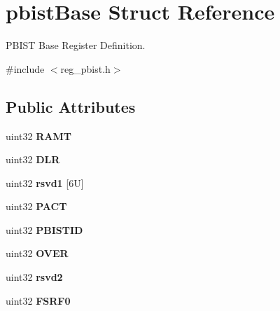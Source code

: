 \hypertarget{structpbistBase}{}\section{pbist\+Base Struct Reference}
\label{structpbistBase}


P\+B\+I\+ST Base Register Definition.  




{\ttfamily \#include $<$reg\+\_\+pbist.\+h$>$}

\subsection*{Public Attributes}
\begin{DoxyCompactItemize}
\item 
\mbox{\label{structpbistBase_a2df152f628e9d97d709a1a7144040f54}} 
uint32 {\bfseries R\+A\+MT}
\item 
\mbox{\label{structpbistBase_a7ea6dea52de73f6a916d2333b97f6a6a}} 
uint32 {\bfseries D\+LR}
\item 
\mbox{\label{structpbistBase_abf388c42671ac58092951e0e1b426252}} 
uint32 {\bfseries rsvd1} \mbox{[}6\+U\mbox{]}
\item 
\mbox{\label{structpbistBase_abe23111b6eda4d62189d0b6928335f43}} 
uint32 {\bfseries P\+A\+CT}
\item 
\mbox{\label{structpbistBase_aaa75f145705788057ce2a522b67ac0ff}} 
uint32 {\bfseries P\+B\+I\+S\+T\+ID}
\item 
\mbox{\label{structpbistBase_a0d21a7640e987922a0851655d4b8f7b6}} 
uint32 {\bfseries O\+V\+ER}
\item 
\mbox{\label{structpbistBase_a129ed1054c204845c953b265dd91f42a}} 
uint32 {\bfseries rsvd2}
\item 
\mbox{\label{structpbistBase_a62a7ed5bc8261c86b45fb2b57db1d918}} 
uint32 {\bfseries F\+S\+R\+F0}
\item 
\mbox{\label{structpbistBase_a44eb0c316b37263d7faa856a74077947}} 

\end{DoxyCompactItemize}
